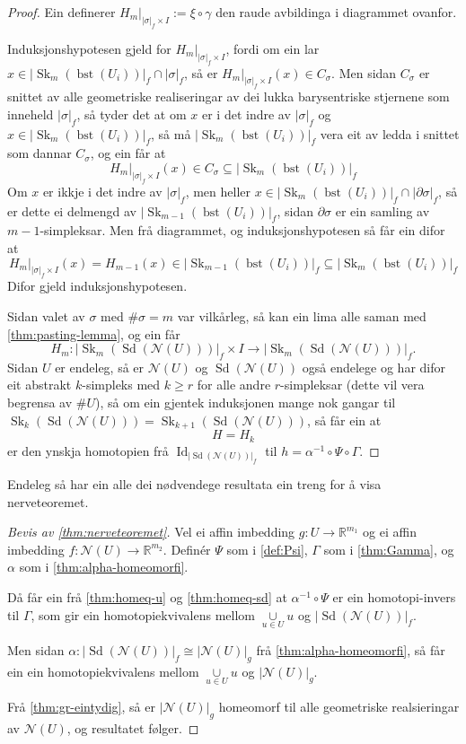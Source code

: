 \documentclass[a4paper, 12pt, norsk]{article}
\theoremstyle{plain}
\theoremstyle{definition}
\newcommand{\Rb}{\mathbb{R}}
\newcommand{\Nc}{\mathcal{N}}
\newcommand{\intersect}{ \mathop{\cap}\limits }
\newcommand{\union}{ \mathop{\cup}\limits }
\newcommand{\gr}[1]{ \lvert #1 \rvert } %
\DeclareMathOperator{\Sd}{Sd} %
\DeclareMathOperator{\bst}{bst} %
\DeclareMathOperator{\Sk}{Sk} %
\DeclareMathOperator{\Id}{Id} %
\begin{document}
\begin{proof}
	Ein definerer \( H_m|_{\gr{\sigma}_f \times I} := \xi \circ \gamma \) den raude avbildinga i diagrammet ovanfor.

	Induksjonshypotesen gjeld for \( H_m|_{\gr{\sigma}_f \times I} \), fordi om ein lar \( x \in \gr{\Sk_m(\bst(U_i))}_f \intersect \gr{\sigma}_f \), så er \( H_m|_{\gr{\sigma}_f \times I}(x) \in C_\sigma \). Men sidan \( C_\sigma \) er snittet av alle geometriske realiseringar av dei lukka barysentriske stjernene som inneheld \( \gr{\sigma}_f \), så tyder det at om \( x \) er i det indre av \( \gr{\sigma}_f \) og \( x \in \gr{\Sk_m(\bst(U_i))}_f \), så må \( \gr{\Sk_m(\bst(U_i))}_f \) vera eit av ledda i snittet som dannar \( C_\sigma \), og ein får at
	\[
		H_m|_{\gr{\sigma}_f \times I}(x) \in C_\sigma \subseteq \gr{\Sk_m(\bst(U_i))}_f
	\]
	Om \( x \) er ikkje i det indre av \( \gr{\sigma}_f \), men heller \( x \in \gr{\Sk_m(\bst(U_i))}_f \intersect \gr{\partial\sigma}_f \), så er dette ei delmengd av \( \gr{\Sk_{m-1}(\bst(U_i))}_f \), sidan \( \partial\sigma \) er ein samling av \( m-1 \)-simpleksar. Men frå diagrammet, og induksjonshypotesen så får ein difor at
	\[
		H_m|_{\gr{\sigma}_f \times I}(x) = H_{m-1}(x) \in \gr{\Sk_{m-1}(\bst(U_i))}_f \subseteq \gr{\Sk_{m}(\bst(U_i))}_f
	\]
	Difor gjeld induksjonshypotesen.

	Sidan valet av \( \sigma \) med \( \#\sigma = m \) var vilkårleg, så kan ein lima alle saman med \autoref{thm:pasting-lemma}, og ein får
	\[
		H_m : \gr{\Sk_m(\Sd(\Nc(U)))}_f \times I \to \gr{\Sk_m(\Sd(\Nc(U)))}_f.
	\]
	Sidan \( U \) er endeleg, så er \( \Nc(U) \) og \( \Sd(\Nc(U)) \) også endelege og har difor eit abstrakt \( k \)-simpleks med \( k \geq r \) for alle andre \( r \)-simpleksar (dette vil vera begrensa av \( \#U \)), så om ein gjentek induksjonen mange nok gangar til \( \Sk_{k}(\Sd(\Nc(U))) = \Sk_{k+1}(\Sd(\Nc(U))) \), så får ein at
	\[
		H = H_k
	\]
	er den ynskja homotopien frå \( \Id_{\gr{\Sd(\Nc(U))}_f} \) til \( h = \alpha^{-1} \circ \Psi \circ \Gamma \).
\end{proof}

Endeleg så har ein alle dei nødvendege resultata ein treng for å visa nerveteoremet.

\begin{proof}[Bevis av \autoref{thm:nerveteoremet}]
	Vel ei affin imbedding \( g: U \to \Rb^{m_1} \) og ei affin imbedding \( f: \Nc(U) \to \Rb^{m_2} \). Definér \( \Psi \) som i \autoref{def:Psi}, \( \Gamma \) som i \autoref{thm:Gamma}, og \( \alpha \) som i \autoref{thm:alpha-homeomorfi}.

	Då får ein frå \autoref{thm:homeq-u} og \autoref{thm:homeq-sd} at \( \alpha^{-1} \circ \Psi \) er ein homotopi-invers til \( \Gamma \), som gir ein homotopiekvivalens mellom \( \union_{u \in U} u \) og \( \gr{\Sd(\Nc(U))}_f \).

	Men sidan \( \alpha : \gr{\Sd(\Nc(U))}_f \cong \gr{\Nc(U)}_g \) frå \autoref{thm:alpha-homeomorfi}, så får ein ein homotopiekvivalens mellom \( \union_{u \in U} u \) og \( \gr{\Nc(U)}_g \).

	Frå \autoref{thm:gr-eintydig}, så er \( \gr{\Nc(U)}_g \) homeomorf til alle geometriske realsieringar av \( \Nc(U) \), og resultatet følger.
\end{proof}
\end{document}
